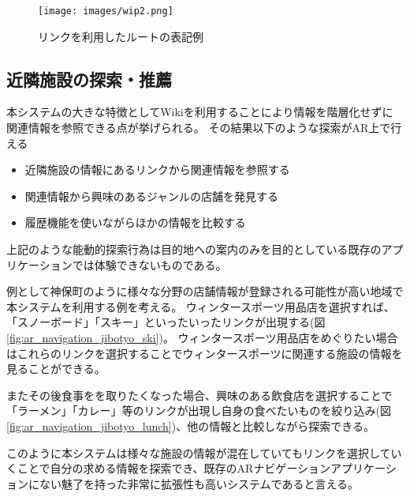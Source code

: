 \begin{figure}[h]
  \centering
  \texttt{[image: images/wip2.png]}
  \caption{リンクを利用したルートの表記例} \label{fig:ar_navigation_ad}
\end{figure}

\subsection{近隣施設の探索・推薦}

本システムの大きな特徴としてWikiを利用することにより情報を階層化せずに関連情報を参照できる点が挙げられる。
その結果以下のような探索がAR上で行える
\begin{itemize}
  \item 近隣施設の情報にあるリンクから関連情報を参照する
  \item 関連情報から興味のあるジャンルの店舗を発見する
  \item 履歴機能を使いながらほかの情報を比較する
\end{itemize}
上記のような能動的探索行為は目的地への案内のみを目的としている既存のアプリケーションでは体験できないものである。


例として神保町のように様々な分野の店舗情報が登録される可能性が高い地域で本システムを利用する例を考える。
ウィンタースポーツ用品店を選択すれば、「スノーボード」「スキー」といったいったリンクが出現する(図\ref{fig:ar_navigation_jibotyo_ski})。
ウィンタースポーツ用品店をめぐりたい場合はこれらのリンクを選択することでウィンタースポーツに関連する施設の情報を見ることができる。

またその後食事をを取りたくなった場合、興味のある飲食店を選択することで「ラーメン」「カレー」等のリンクが出現し自身の食べたいものを絞り込み(図\ref{fig:ar_navigation_jibotyo_lunch})、他の情報と比較しながら探索できる。

このように本システムは様々な施設の情報が混在していてもリンクを選択していくことで自分の求める情報を探索でき、既存のARナビゲーションアプリケーションにない魅了を持った非常に拡張性も高いシステムであると言える。


